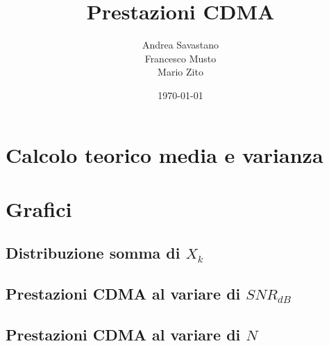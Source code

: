 \documentclass[12pt, a4paper]{article}
\title{Prestazioni CDMA}
\author{Andrea Savastano \\Francesco Musto \\Mario Zito}
\date{\today}
\newcommand{\disablelinkcolor}{%
	\hypersetup{linkcolor=black}%
}
\begin{document}
	\disablelinkcolor	
	\maketitle
	\tableofcontents
	
	\newpage
	\thispagestyle{fancy}
	\section{Calcolo teorico media e varianza}
	
	
	\newpage
	\fancyfoot{}
	\section{Grafici}
	\subsection{Distribuzione somma di \(X_k\)}
	
	
	\newpage
	\subsection{Prestazioni CDMA al variare di \(SNR_{dB}\)}
	
	
	\newpage
	\subsection{Prestazioni CDMA al variare di \(N\)}
	
	
\end{document}
